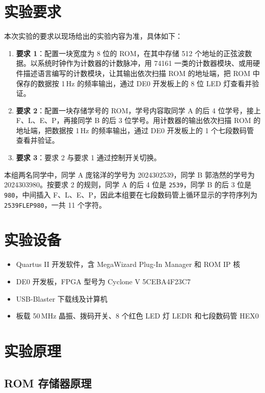\documentclass[12pt]{ctexart}
\begin{document}
\section{实验要求}

本次实验的要求以现场给出的实验内容为准，具体如下：

\begin{enumerate}
    \item \textbf{要求 1}：配置一块宽度为 8 位的 ROM，在其中存储 512 个地址的正弦波数据。以系统时钟作为计数器的计数脉冲，用 74161 一类的计数器模块、或用硬件描述语言编写的计数模块，让其输出依次扫描 ROM 的地址端，把 ROM 中保存的数据按 1\,Hz 的频率输出，通过 DE0 开发板上的 8 位 LED 灯查看并验证。
    \item \textbf{要求 2}：配置一块存储学号的 ROM，学号内容取同学 A 的后 4 位学号，接上 F、L、E、P，再接同学 B 的后 3 位学号。用计数器的输出依次扫描 ROM 的地址端，把数据按 1\,Hz 的频率输出，通过 DE0 开发板上的 1 个七段数码管查看并验证。
    \item \textbf{要求 3}：要求 2 与要求 1 通过控制开关切换。
\end{enumerate}

本组两名同学中，同学 A 庞铭洋的学号为 2024302539，同学 B 郭浩然的学号为 2024303980。按要求 2 的规则，同学 A 的后 4 位是 \texttt{2539}，同学 B 的后 3 位是 \texttt{980}，中间插入 F、L、E、P，因此本组要在七段数码管上循环显示的字符序列为 \texttt{2539FLEP980}，一共 11 个字符。

\section{实验设备}

\begin{itemize}
    \item Quartus II 开发软件，含 MegaWizard Plug-In Manager 和 ROM IP 核
    \item DE0 开发板，FPGA 型号为 Cyclone V 5CEBA4F23C7
    \item USB-Blaster 下载线及计算机
    \item 板载 50\,MHz 晶振、拨码开关、8 个红色 LED 灯 LEDR 和七段数码管 HEX0
\end{itemize}

\section{实验原理}

\subsection{ROM 存储器原理}
\end{document}
